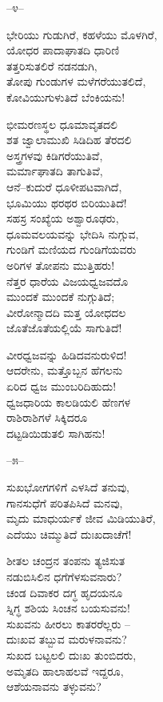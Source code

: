 \begin{center}
–೪–
\end{center}

ಭೇರಿಯು ಗುಡುಗಿರೆ, ಕಹಳೆಯು ಮೊಳಗಿರೆ,\\ಯೋಧರ ಪಾದಾಘಾತದಿ ಧಾರಿಣಿ\\ತತ್ತರಿಸುತಲಿರೆ ನಡನಡುಗಿ,\\ತೋಪು ಗುಂಡುಗಳ ಮಳೆಗರೆಯುತಲಿದೆ,\\ಕೋವಿಯುಗುಳುತಿದೆ ಬೆಂಕಿಯನು!

ಭೀಮರಣಸ್ಥಲ ಧೂಮಾವೃತದಲಿ\\ಶತ ಜ್ವಾಲಾಮುಖಿ ಸಿಡಿದಿಹ ತೆರದಲಿ\\ಅಸ್ತ್ರಗಳವು ಕಿಡಿಗರೆಯುತಿವೆ,\\ಮರ್ಮಾಘಾತದಿ ತಾಗುತಿವೆ,\\ಆನೆ–ಕುದುರೆ ಧೂಳೀಪಟವಾಗಿದೆ,\\ಭೂಮಿಯು ಥರಥರ ಬಿರಿಯುತಿದೆ!\\ಸಹಸ್ರ ಸಂಖ್ಯೆಯ ಅಶ್ವಾರೂಢರು,\\ಧೂಮವಲಯವನ್ನು ಭೇದಿಸಿ ನುಗ್ಗುವ,\\ಗುಂಡಿಗೆ ಮಣಿಯದ ಗುಂಡಿಗೆಯವರು\\ಅರಿಗಳ ತೋಪನು ಮುತ್ತಿಹರು!\\
 ನೆತ್ತರ ಧಾರೆಯ ವಿಜಯಧ್ವಜವದೊ\\ಮುಂದಕೆ ಮುಂದಕೆ ನುಗ್ಗುತಿದೆ;\\ವೀರೋನ್ಮಾದದಿ ಮತ್ತ ಯೋಧದಲ\\ಜೊತೆಜೊತೆಯಲ್ಲಿಯೆ ಸಾಗುತಿದೆ!

ವೀರಧ್ವಜವನ್ನು ಹಿಡಿದವನುರುಳಿದ!\\ಆದರೇನು, ಮತ್ತೊಬ್ಬನ ಹೆಗಲನು\\ಏರಿದ ಧ್ವಜ ಮುಂಬರಿದಿಹುದು!\\ಧ್ವಜಧಾರಿಯ ಕಾಲಡಿಯಲಿ ಹೆಣಗಳ\\ರಾಶಿರಾಶಿಗಳೆ ಸಿಕ್ಕಿದರೂ\\ದಟ್ಟಡಿಯಿಡುತಲಿ ಸಾಗಿಹನು!

\begin{center}
–೫–
\end{center}

ಸುಖಭೋಗಗಳಿಗೆ ಎಳಸಿದೆ ತನುವು,\\ಗಾನಸುಧೆಗೆ ಪರಿತಪಿಸಿದೆ ಮನವು,\\ಮೃದು ಮಾಧುರ್ಯಕೆ ಜೀವ ಮಿಡಿಯುತಿರೆ,\\ಎದೆಯು ಚಿಮ್ಮುತಿದೆ ದುಃಖದಾಚೆಗೆ!

ಶೀತಲ ಚಂದ್ರನ ತಂಪನು ತ್ಯಜಿಸುತ\\ನಡುಬಿಸಿಲಿನ ಧಗೆಗೆಳಸುವನಾರು?\\ಚಂಡ ದಿವಾಕರ ದಗ್ಧ ಹೃದಯನೂ\\ಸ್ನಿಗ್ಧ ಶಶಿಯ ಸಿಂಚನ ಬಯಸುವನು!\\
 ಸುಖವನು ಹೀರಲು ಕಾತರರೆಲ್ಲರು –\\ದುಃಖವ ತಬ್ಬುವ ಮರುಳನಾವನು?\\ಸುಖದ ಬಟ್ಟಲಲಿ ದುಃಖ ತುಂಬಿದರು,\\ಅಮೃತದಿ ಹಾಲಾಹಲವೆ ಇದ್ದರೂ,\\ಆಶೆಯನಾವನು ತಳ್ಳುವನು?

